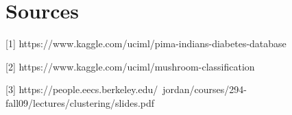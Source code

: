 \documentclass[11pt]{article}
\begin{document}
        \section{Sources}

        [1] https://www.kaggle.com/uciml/pima-indians-diabetes-database

        [2] https://www.kaggle.com/uciml/mushroom-classification

        [3] https://people.eecs.berkeley.edu/~jordan/courses/294-fall09/lectures/clustering/slides.pdf



    
\end{document}
